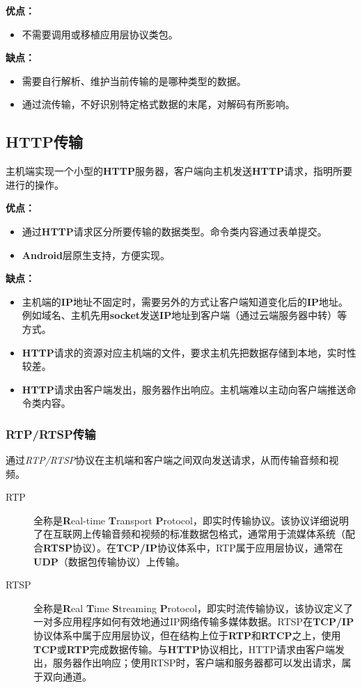 \documentclass[11pt,a4paper]{article}
\begin{document}
\begin{CJK}{UTF8}{gbsn}
    \textbf{优点：}
    \begin{itemize}
        \item 不需要调用或移植应用层协议类包。
    \end{itemize}

    \textbf{缺点：}
    \begin{itemize}
        \item 需要自行解析、维护当前传输的是哪种类型的数据。
        \item 通过流传输，不好识别特定格式数据的末尾，对解码有所影响。
    \end{itemize}

    \subsection{HTTP传输}
    主机端实现一个小型的\textbf{HTTP}服务器，客户端向主机发送\textbf{HTTP}请求，指明所要进行的操作。\par
    \textbf{优点：}
    \begin{itemize}
        \item 通过\textbf{HTTP}请求区分所要传输的数据类型。命令类内容通过表单提交。
        \item \textbf{Android}层原生支持，方便实现。
    \end{itemize}

    \textbf{缺点：}
    \begin{itemize}
        \item 主机端的\textbf{IP}地址不固定时，需要另外的方式让客户端知道变化后的\textbf{IP}地址。例如域名、主机先用\textbf{socket}发送\textbf{IP}地址到客户端（通过云端服务器中转）等方式。
        \item \textbf{HTTP}请求的资源对应主机端的文件，要求主机先把数据存储到本地，实时性较差。
        \item \textbf{HTTP}请求由客户端发出，服务器作出响应。主机端难以主动向客户端推送命令类内容。
    \end{itemize}

    \subsubsection{RTP/RTSP传输}
    通过\emph{RTP/RTSP}协议在主机端和客户端之间双向发送请求，从而传输音频和视频。
    \begin{description}
    \item[RTP] 全称是\textbf{R}eal-time \textbf{T}ransport \textbf{P}rotocol，即实时传输协议。该协议详细说明了在互联网上传输音频和视频的标准数据包格式，通常用于流媒体系统（配合\textbf{RTSP}协议）。在\textbf{TCP/IP}协议体系中，RTP属于应用层协议，通常在\textbf{UDP}（数据包传输协议）上传输。
    \item[RTSP] 全称是\textbf{R}eal \textbf{T}ime \textbf{S}treaming \textbf{P}rotocol，即实时流传输协议，该协议定义了一对多应用程序如何有效地通过IP网络传输多媒体数据。RTSP在\textbf{TCP/IP}协议体系中属于应用层协议，但在结构上位于\textbf{RTP}和\textbf{RTCP}之上，使用\textbf{TCP}或\textbf{RTP}完成数据传输。与\textbf{HTTP}协议相比，HTTP请求由客户端发出，服务器作出响应；使用RTSP时，客户端和服务器都可以发出请求，属于双向通道。
    \end{description}


\end{CJK}
\end{document}
